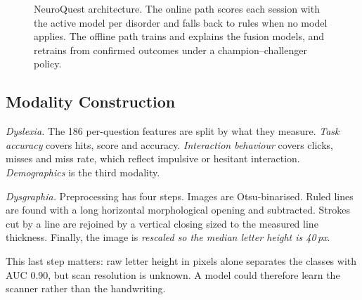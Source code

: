\documentclass[conference]{IEEEtran}
\begin{document}
\begin{figure}[t]
\caption{NeuroQuest architecture. The online path scores each session with the active model per disorder and falls
back to rules when no model applies. The offline path trains and explains the fusion models, and retrains from
confirmed outcomes under a champion--challenger policy.}
\label{fig:arch}
\end{figure}

\subsection{Modality Construction}
\textit{Dyslexia.} The 186 per-question features are split by what they measure. \emph{Task accuracy} covers hits,
score and accuracy. \emph{Interaction behaviour} covers clicks, misses and miss rate, which reflect impulsive or
hesitant interaction. \emph{Demographics} is the third modality.

\textit{Dysgraphia.} Preprocessing has four steps. Images are Otsu-binarised. Ruled lines are found with a long
horizontal morphological opening and subtracted. Strokes cut by a line are rejoined by a vertical closing sized to
the measured line thickness. Finally, the image is \emph{rescaled so the median letter height is 40\,px}.

This last step matters: raw letter height in pixels alone separates the classes with AUC 0.90, but scan resolution
is unknown. A model could therefore learn the scanner rather than the handwriting.
\end{document}
